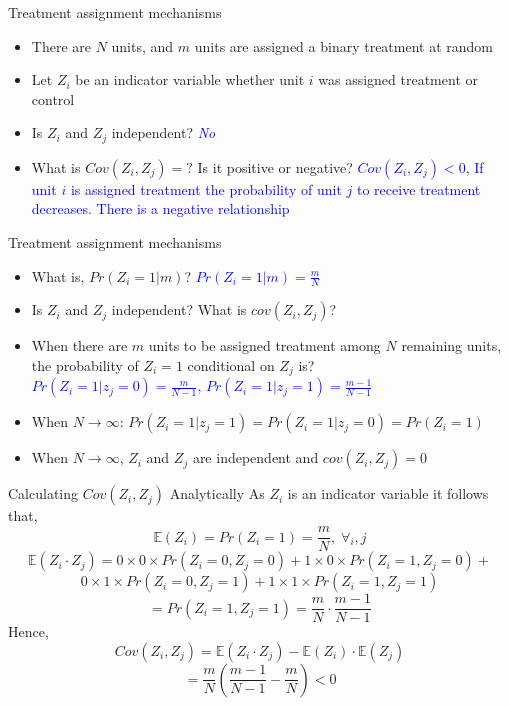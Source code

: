 \documentclass[handout]{beamer}
\theoremstyle{definition}
\begin{document}
\begin{frame}{Treatment assignment mechanisms}
\begin{itemize}
\item There are $N$ units, and $m$ units are assigned a binary treatment at random
\item Let $Z_i$ be an indicator variable whether unit $i$ was assigned treatment or control 
\item Is $Z_i$ and $Z_j$ independent? \pause \textcolor{blue}{\textit{No}}
\item What is $Cov(Z_i,Z_j)=?$ Is it positive or negative? \pause \textcolor{blue}{\textit{$Cov(Z_i,Z_j)<0$}, If unit $i$ is assigned treatment the probability of unit $j$ to receive treatment decreases. There is a negative relationship} 
\end{itemize}
\end{frame}

\begin{frame}{Treatment assignment mechanisms}
\begin{itemize}
\item What is, $Pr(Z_i=1|m)$? \pause \textcolor{blue}{$Pr(Z_i=1|m) = \frac{m}{N}$}
\item Is $Z_i$ and $Z_j$ independent? What is $cov(Z_i,Z_j)$? \pause
\item When there are $m$ units to be assigned treatment among $N$ remaining units, the probability of $Z_i=1$ conditional on $Z_j$ is? \\ \pause 
\textcolor{blue}{$Pr(Z_i=1|z_j=0) = \frac{m}{N-1}$,
 $Pr(Z_i=1|z_j=1) = \frac{m-1}{N-1}$}  
\item When $N\rightarrow\infty$: $Pr(Z_i=1|z_j=1)=Pr(Z_i=1|z_j=0)=Pr(Z_i=1)$ 
\pause
\item When $N \rightarrow \infty$, $Z_i$ and $Z_j$ are independent and $cov(Z_i,Z_j)=0$
\end{itemize}
\end{frame}


\begin{frame}{Calculating $Cov(Z_i,Z_j)$ Analytically}
As $Z_i$ is an indicator variable it follows that,
$$ \mathbb{E}(Z_i) = Pr(Z_i=1)=\frac{m}{N},\; \forall_i,j$$
\pause
$$ \mathbb{E}(Z_i \cdot Z_j) = 0\times 0 \times Pr(Z_i=0, Z_j=0)+ 1\times 0 \times Pr(Z_i=1, Z_j=0)+$$
$$ 0\times 1 \times Pr(Z_i=0, Z_j=1)+1\times 1 \times Pr(Z_i=1, Z_j=1)$$
\pause
$$ = Pr(Z_i=1, Z_j=1) = \frac{m}{N}\cdot \frac{m-1}{N-1}$$
Hence,\pause
$$Cov(Z_i,Z_j) = \mathbb{E}(Z_i \cdot Z_j) - \mathbb{E}(Z_i) \cdot \mathbb{E}(Z_j)$$
$$ = \frac{m}{N} \left(  \frac{m-1}{N-1} - \frac{m}{N} \right) < 0$$
\end{frame}
\end{document}
